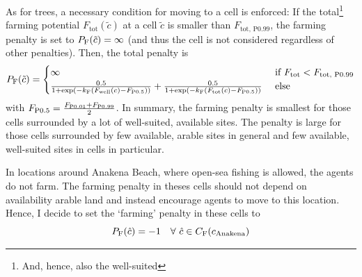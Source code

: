 As for trees, a necessary condition for moving to a cell is enforced:
 If the total\footnote{And, hence, also the well-suited} farming potential $F_\text{tot}(\tilde{c})$ at a cell $\tilde{c}$ is smaller than $F_\text{tot, P0.99}$, the farming penalty is set to $P_{\rm F}(\tilde{c}) = \infty$ (and thus the cell is not considered regardless of other penalties).
Then, the total penalty is 
\begin{equation}
P_{\rm F} (\tilde{c}) = 
\begin{cases} 
\infty & \text{ if } F_\text{tot} < F_\text{tot, P0.99}\\
\frac{0.5}{1+\exp\left( - k_{\rm F} (F_\text{well}(c)-F_\text{P0.5}) \right)} + \frac{0.5}{1+\exp\left( - k_{\rm F} (F_\text{tot}(c)-F_\text{P0.5}) \right)} & \text{ else}
\end{cases}
\end{equation}
with $F_\text{P0.5} = \frac{F_{\rm P0.01}+F_{\rm P0.99}}{2}$.
In summary, the farming penalty is smallest for those cells surrounded by a lot of well-suited, available sites.
The penalty is large for those cells surrounded by few available, arable sites in general and few available, well-suited sites in cells in particular.

In locations around Anakena Beach, where open-sea fishing is allowed, the agents do not farm. 
The farming penalty in theses cells should not depend on availability arable land and instead encourage agents to move to this location.
Hence, I decide to set the `farming' penalty in these cells to
\begin{equation}
	P_{\rm F}(\hat{c}) = - 1 %
	 \quad \forall \  \hat{c} \in C_\text{F}(c_{\rm Anakena})
\end{equation}


